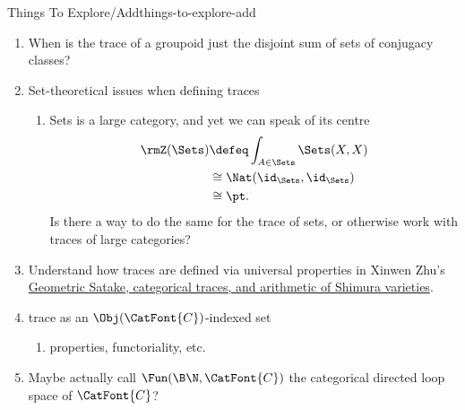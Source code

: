 \begin{remark}{Things To Explore/Add}{things-to-explore-add}
\begin{enumerate}
\begin{enumerate}
\begin{enumerate}
                        \item category of finite groups
                        \item category of finite abelian groups
                        \item category of finite $p$-groups for fixed $p$
                        \item category of finite $p$-groups for all $p$
                        \item category of finite fields
                        \item category of finite topological spaces
                        \item category of finite [insert a mathematical object here]
                    \end{enumerate}
            \end{enumerate}
        \item When is the trace of a groupoid just the disjoint sum of sets of conjugacy classes?
        \item Set-theoretical issues when defining traces
            \begin{enumerate}
                \item Sets is a large category, and yet we can speak of its centre
                    \begin{align*}
                        \rmZ(\Sets) &\defeq \int_{A\in\Sets}\Sets(X,X)\\%
                                    &\cong  \Nat(\id_{\Sets},\id_{\Sets})\\
                                    &\cong  \pt.
                    \end{align*}
                    Is there a way to do the same for the trace of sets, or otherwise work with traces of large categories?
            \end{enumerate}
        \item Understand how traces are defined via universal properties in Xinwen Zhu's \href{https://arxiv.org/abs/1810.07375}{Geometric Satake, categorical traces, and arithmetic of Shimura varieties}.
        \item trace as an $\Obj(\CatFont{C})$-indexed set
            \begin{enumerate}
                \item properties, functoriality, etc.
            \end{enumerate}
        \item Maybe actually call $\Fun(\B\N,\CatFont{C})$ the categorical directed loop space of $\CatFont{C}$?

\end{enumerate}
\end{remark}
